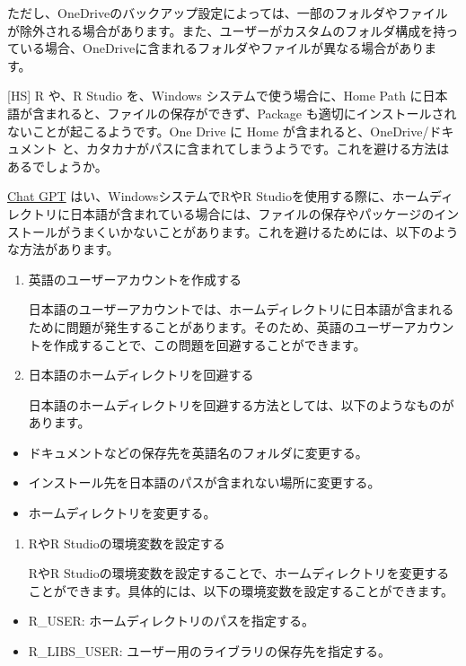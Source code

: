 \documentclass[
]{bxjsbook}
\providecommand{\tightlist}{%
  \setlength{\itemsep}{0pt}\setlength{\parskip}{0pt}}
\theoremstyle{definition}
\theoremstyle{definition}
\theoremstyle{definition}
\theoremstyle{definition}
\theoremstyle{remark}
\begin{document}
ただし、OneDriveのバックアップ設定によっては、一部のフォルダやファイルが除外される場合があります。また、ユーザーがカスタムのフォルダ構成を持っている場合、OneDriveに含まれるフォルダやファイルが異なる場合があります。

{[}HS{]} R や、R Studio を、Windows システムで使う場合に、Home Path に日本語が含まれると、ファイルの保存ができず、Package も適切にインストールされないことが起こるようです。One Drive に Home が含まれると、OneDrive/ドキュメント と、カタカナがパスに含まれてしまうようです。これを避ける方法はあるでしょうか。

\protect\hyperlink{chatgpt}{Chat GPT} はい、WindowsシステムでRやR Studioを使用する際に、ホームディレクトリに日本語が含まれている場合には、ファイルの保存やパッケージのインストールがうまくいかないことがあります。これを避けるためには、以下のような方法があります。

\begin{enumerate}
\def\labelenumi{\arabic{enumi}.}
\item
  英語のユーザーアカウントを作成する

  日本語のユーザーアカウントでは、ホームディレクトリに日本語が含まれるために問題が発生することがあります。そのため、英語のユーザーアカウントを作成することで、この問題を回避することができます。
\item
  日本語のホームディレクトリを回避する

  日本語のホームディレクトリを回避する方法としては、以下のようなものがあります。
\end{enumerate}

\begin{itemize}
\tightlist
\item
  ドキュメントなどの保存先を英語名のフォルダに変更する。
\item
  インストール先を日本語のパスが含まれない場所に変更する。
\item
  ホームディレクトリを変更する。
\end{itemize}

\begin{enumerate}
\def\labelenumi{\arabic{enumi}.}
\setcounter{enumi}{2}
\item
  RやR Studioの環境変数を設定する

  RやR Studioの環境変数を設定することで、ホームディレクトリを変更することができます。具体的には、以下の環境変数を設定することができます。
\end{enumerate}

\begin{itemize}
\tightlist
\item
  R\_USER: ホームディレクトリのパスを指定する。
\item
  R\_LIBS\_USER: ユーザー用のライブラリの保存先を指定する。
\end{itemize}
\end{document}
